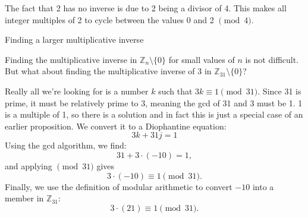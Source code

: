 The fact that 2 has no inverse is due to 2 being a divisor of 4.  This makes all integer multiples of 2 to cycle between the values 0 and 2 $\pmod 4$. 


\begin{example}{Finding a larger multiplicative inverse}


Finding the multiplicative inverse in $\mathbb{Z}_n \setminus \{0\}$ for small values of $n$  is not difficult.  But what about finding the multiplicative inverse of 3 in $\mathbb{Z}_{31}\setminus \{0\}$?  

% 





Really all we're looking for is a number $k$ such that $3k \equiv 1 \pmod {31}$.  Since 31 is prime, it must be relatively prime to 3, meaning the gcd of 31 and 3 must be 1.  1 is a multiple of 1, so there is a solution and in fact this is just a special case of an earlier proposition.  We convert it to a Diophantine equation:
\[3k + 31j = 1\]
Using the gcd algorithm, we find:
\[31+3\cdot(-10) = 1,\]
and applying $\pmod{31}$ gives
\[3\cdot(-10) \equiv 1 \pmod{31}.\]
Finally, we use the definition of modular arithmetic to convert $-10$ into a member in $\mathbb{Z}_{31}$:
\[3\cdot(21) \equiv 1 \pmod{31}.\] 
\end{example}


